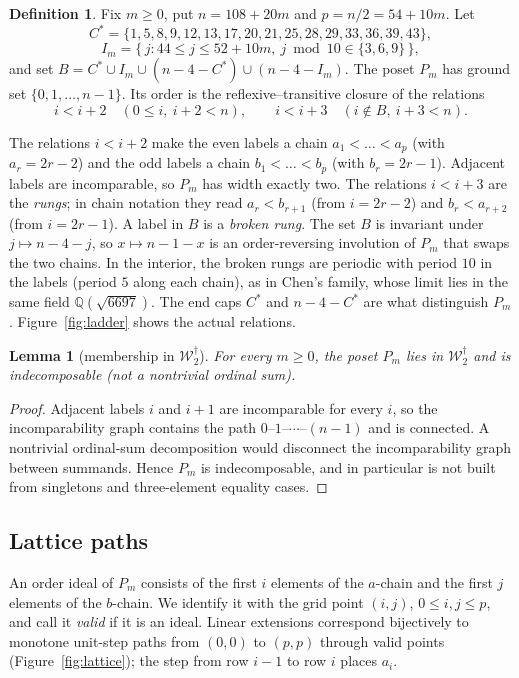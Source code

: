 \documentclass[11pt]{amsart}
\newtheorem{lemma}[theorem]{Lemma}
\theoremstyle{definition}
\newtheorem{definition}[theorem]{Definition}
\theoremstyle{remark}
\newcommand{\Wdag}{\mathcal{W}_2^{\dagger}}
\begin{document}
\begin{definition}
Fix $m\ge0$, put $n=108+20m$ and $p=n/2=54+10m$. Let
\[
C^*=\{1,5,8,9,12,13,17,20,21,25,28,29,33,36,39,43\},
\]
\[
I_m=\{\,j: 44\le j\le 52+10m,\ j\bmod 10\in\{3,6,9\}\,\},
\]
and set $B=C^*\cup I_m\cup(n-4-C^*)\cup(n-4-I_m)$. The poset $P_m$ has ground set $\{0,1,\dots,n-1\}$. Its order is the reflexive--transitive closure of the relations
\[
i<i+2\quad(0\le i,\ i+2<n),\qquad i<i+3\quad(i\notin B,\ i+3<n).
\]
\end{definition}

The relations $i<i+2$ make the even labels a chain $a_1<\dots<a_p$ (with $a_r=2r-2$) and the odd labels a chain $b_1<\dots<b_p$ (with $b_r=2r-1$). Adjacent labels are incomparable, so $P_m$ has width exactly two. The relations $i<i+3$ are the \emph{rungs}; in chain notation they read $a_r<b_{r+1}$ (from $i=2r-2$) and $b_r<a_{r+2}$ (from $i=2r-1$). A label in $B$ is a \emph{broken rung}. The set $B$ is invariant under $j\mapsto n-4-j$, so $x\mapsto n-1-x$ is an order-reversing involution of $P_m$ that swaps the two chains. In the interior, the broken rungs are periodic with period $10$ in the labels (period $5$ along each chain), as in Chen's family, whose limit lies in the same field $\mathbb{Q}(\sqrt{6697})$. The end caps $C^*$ and $n-4-C^*$ are what distinguish $P_m$. Figure~\ref{fig:ladder} shows the actual relations.

\begin{lemma}[membership in $\Wdag$]\label{lem:wdag}
For every $m\ge0$, the poset $P_m$ lies in $\Wdag$ and is indecomposable (not a nontrivial ordinal sum).
\end{lemma}
\begin{proof}
Adjacent labels $i$ and $i+1$ are incomparable for every $i$, so the incomparability graph contains the path $0$--$1$--$\cdots$--$(n-1)$ and is connected. A nontrivial ordinal-sum decomposition would disconnect the incomparability graph between summands. Hence $P_m$ is indecomposable, and in particular is not built from singletons and three-element equality cases.
\end{proof}

\subsection*{Lattice paths}
An order ideal of $P_m$ consists of the first $i$ elements of the $a$-chain and the first $j$ elements of the $b$-chain. We identify it with the grid point $(i,j)$, $0\le i,j\le p$, and call it \emph{valid} if it is an ideal. Linear extensions correspond bijectively to monotone unit-step paths from $(0,0)$ to $(p,p)$ through valid points (Figure~\ref{fig:lattice}); the step from row $i-1$ to row $i$ places $a_i$.
\end{document}
